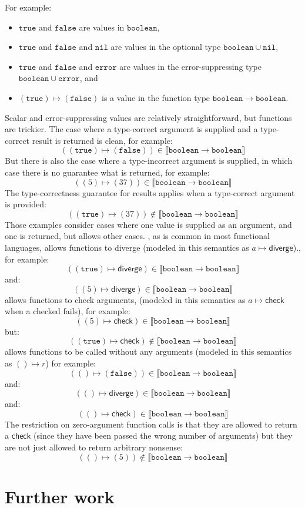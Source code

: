 \documentclass[acmsmall,review,screen]{acmart}
\newcommand{\ERROR}{\mathtt{error}}
\newcommand{\NIL}{\mathtt{nil}}
\newcommand{\TRUE}{\mathtt{true}}
\newcommand{\FALSE}{\mathtt{false}}
\newcommand{\BOOLEAN}{\mathtt{boolean}}
\newcommand{\DIVERGE}{\mathsf{diverge}}
\newcommand{\CHECK}{\mathsf{check}}
\newcommand{\fun}{\mathbin{\rightarrow}}
\newcommand{\sem}[1]{\llbracket{#1}\rrbracket}
\begin{document}
For example:
\begin{itemize}
  
\item $\TRUE$ and $\FALSE$ are values in $\BOOLEAN$,
\item $\TRUE$ and $\FALSE$ and $\NIL$ are values in the optional type $\BOOLEAN \cup \NIL$,
\item $\TRUE$ and $\FALSE$ and $\ERROR$ are values in the error-suppressing type $\BOOLEAN \cup \ERROR$,
  and 
\item $(\TRUE) \mapsto (\FALSE)$ is a value in the function type $\BOOLEAN \fun \BOOLEAN$.

\end{itemize}
Scalar and error-suppressing values are relatively straightforward, but
functions are trickier. The case where a type-correct argument is
supplied and a type-correct result is returned is clean, for example:
\[
  ((\TRUE) \mapsto (\FALSE)) \in \sem{\BOOLEAN \fun \BOOLEAN}
\]
But there is also the case where a type-incorrect argument is
supplied, in which case there is no guarantee what is returned, for example:
\[
  ((5) \mapsto (37)) \in \sem{\BOOLEAN \fun \BOOLEAN}
\]
The type-correctness guarantee for results applies when a type-correct argument is provided:
\[
  ((\TRUE) \mapsto (37)) \not\in \sem{\BOOLEAN \fun \BOOLEAN}
\]
Those examples consider cases where one value is supplied as an argument,
and one is returned, but  allows other cases.
, as is common in most functional languages, allows functions to diverge
(modeled in this semantics as $a \mapsto \DIVERGE$).,
for example:
\[
  ((\TRUE) \mapsto \DIVERGE) \in \sem{\BOOLEAN \fun \BOOLEAN}
\]
and:
\[
  ((5) \mapsto \DIVERGE) \in \sem{\BOOLEAN \fun \BOOLEAN}
\]
 allows functions to check arguments,
(modeled in this semantics as $a \mapsto \CHECK$ when a checked fails),
for example:
\[
  ((5) \mapsto \CHECK) \in \sem{\BOOLEAN \fun \BOOLEAN}
\]
but:
\[
  ((\TRUE) \mapsto \CHECK) \not\in \sem{\BOOLEAN \fun \BOOLEAN}
\]
 allows functions to be called without any arguments
(modeled in this semantics as $() \mapsto r$)
for example:
\[
  (() \mapsto (\FALSE)) \in \sem{\BOOLEAN \fun \BOOLEAN}
\]
and:
\[
  (() \mapsto \DIVERGE) \in \sem{\BOOLEAN \fun \BOOLEAN}
\]
and:
\[
  (() \mapsto \CHECK) \in \sem{\BOOLEAN \fun \BOOLEAN}
\]
The restriction on zero-argument function calls is that they are allowed to return
a $\CHECK$ (since they have been passed the wrong number of arguments)
but they are not just allowed to return arbitrary nonsense:
\[
  (() \mapsto (5)) \not\in \sem{\BOOLEAN \fun \BOOLEAN}
\]

\section{Further work}



\end{document}
